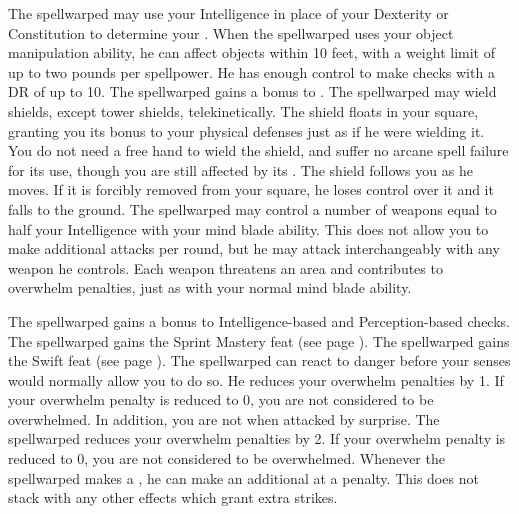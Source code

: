         The spellwarped may use your Intelligence in place of your Dexterity or Constitution to determine your .
        When the spellwarped uses your object manipulation ability, he can affect objects within 10 feet, with a weight limit of up to two pounds per spellpower.
        He has enough control to make checks with a DR of up to 10.
        The spellwarped gains a  bonus to .
        The spellwarped may wield shields, except tower shields, telekinetically.
        The shield floats in your square, granting you its bonus to your physical defenses just as if he were wielding it.
        You do not need a free hand to wield the shield, and suffer no arcane spell failure for its use, though you are still affected by its .
        The shield follows you as he moves.
        If it is forcibly removed from your square, he loses control over it and it falls to the ground.
        The spellwarped may control a number of weapons equal to half your Intelligence with your mind blade ability.
        This does not allow you to make additional attacks per round, but he may attack interchangeably with any weapon he controls.
        Each weapon threatens an area and contributes to overwhelm penalties, just as with your normal mind blade ability.

        The spellwarped gains a  bonus to Intelligence-based and Perception-based checks.
        The spellwarped gains the Sprint Mastery feat (see page ).
        The spellwarped gains the Swift feat (see page ).
        The spellwarped can react to danger before your senses would normally allow you to do so.
        He reduces your overwhelm penalties by 1.
        If your overwhelm penalty is reduced to 0, you are not considered to be overwhelmed.
        In addition, you are not \unaware when attacked by surprise.
        The spellwarped reduces your overwhelm penalties by 2.
        If your overwhelm penalty is reduced to 0, you are not considered to be overwhelmed.
        Whenever the spellwarped makes a , he can make an additional  at a  penalty.
        This does not stack with any other effects which grant extra strikes.

